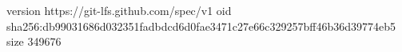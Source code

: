 version https://git-lfs.github.com/spec/v1
oid sha256:db99031686d032351fadbdcd6d0fae3471c27e66c329257bff46b36d39774eb5
size 349676
